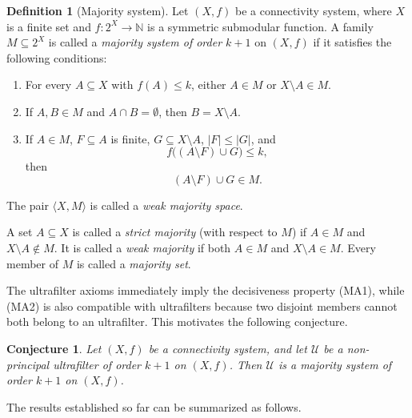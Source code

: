 \documentclass[10pt]{book}
\newtheorem{conjecture}[theorem]{Conjecture}
\theoremstyle{definition}
\newtheorem{definition}[theorem]{Definition}
\begin{document}
\begin{definition}[Majority system]
\label{def:majority-system}
Let \((X,f)\) be a connectivity system, where \(X\) is a finite set and
\(f:2^X\to \mathbb{N}\) is a symmetric submodular function.
A family \(M\subseteq 2^X\) is called a \emph{majority system of order \(k+1\)}
on \((X,f)\) if it satisfies the following conditions:
\begin{enumerate}
    \item[(MA1)] For every \(A\subseteq X\) with \(f(A)\leq k\), either
    \(A\in M\) or \(X\setminus A\in M\).
    \item[(MA2)] If \(A,B\in M\) and \(A\cap B=\emptyset\), then
    \(B=X\setminus A\).
    \item[(MA3)] If \(A\in M\), \(F\subseteq A\) is finite, \(G\subseteq X\setminus A\),
    \(|F|\leq |G|\), and
    \[
    f\bigl((A\setminus F)\cup G\bigr)\leq k,
    \]
    then
    \[
    (A\setminus F)\cup G \in M.
    \]
\end{enumerate}
The pair \(\langle X,M\rangle\) is called a \emph{weak majority space}.

A set \(A\subseteq X\) is called a \emph{strict majority} (with respect to \(M\))
if \(A\in M\) and \(X\setminus A\notin M\).
It is called a \emph{weak majority} if both \(A\in M\) and \(X\setminus A\in M\).
Every member of \(M\) is called a \emph{majority set}.
\end{definition}

The ultrafilter axioms immediately imply the decisiveness property (MA1),
while (MA2) is also compatible with ultrafilters because two disjoint members
cannot both belong to an ultrafilter.
This motivates the following conjecture.

\begin{conjecture}
\label{conj:ultrafilter-majority}
Let \((X,f)\) be a connectivity system, and let \(\mathcal{U}\) be a non-principal
ultrafilter of order \(k+1\) on \((X,f)\).
Then \(\mathcal{U}\) is a majority system of order \(k+1\) on \((X,f)\).
\end{conjecture}

The results established so far can be summarized as follows.
\end{document}
